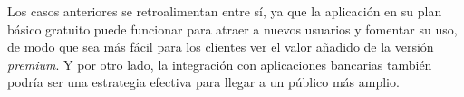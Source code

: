 Los casos anteriores se retroalimentan entre sí, ya que la aplicación en su plan básico gratuito puede funcionar para atraer a nuevos usuarios y fomentar su uso, de modo que sea más fácil para los clientes ver el valor añadido de la versión \textit{premium}. Y por otro lado, la integración con aplicaciones bancarias también podría ser una estrategia efectiva para llegar a un público más amplio.

